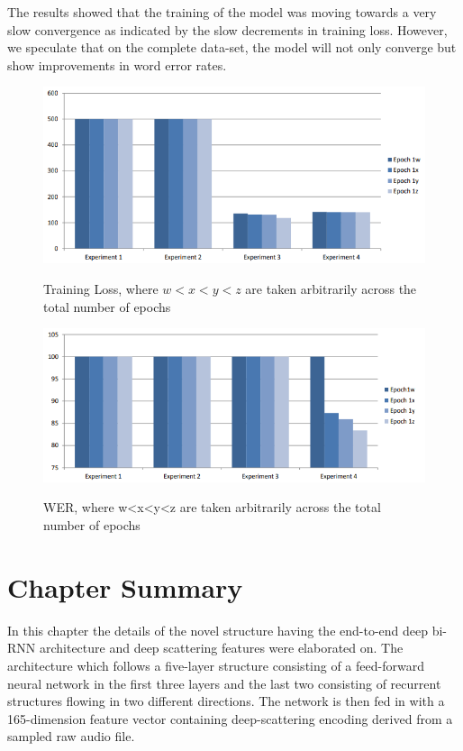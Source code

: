 The results showed that the training of the model was moving towards a very slow convergence as indicated by the slow decrements in training loss.  However, we speculate that on the complete data-set, the model will not only converge but show improvements in word error rates.
\begin{figure}
\centering
  \includegraphics[width=14cm]{thesis/images/res00.PNG}\\
  \caption{Training Loss, where $w<x<y<z$ are taken arbitrarily across the
total number of epochs} \label{fig_6_2_loss}
\end{figure}
\begin{figure}
\centering
  \includegraphics[width=14cm]{thesis/images/res01.PNG}\\
  \caption{WER, where w<x<y<z are taken arbitrarily across the total
number of epochs} \label{fig_6_3_wer}
\end{figure}

\section{Chapter Summary}

In this chapter the details of the novel structure having the end-to-end deep bi-RNN architecture and deep scattering features were elaborated on.  The architecture which follows a five-layer structure consisting of a feed-forward neural network in the first three layers and the last two consisting of recurrent structures flowing in two different directions.  The network is then fed in with a 165-dimension feature vector containing deep-scattering encoding derived from a sampled raw audio file.

